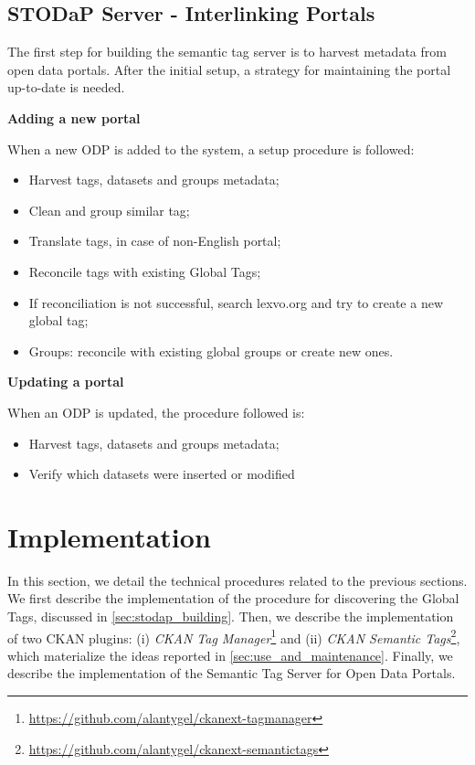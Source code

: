 \subsection{STODaP Server - Interlinking Portals}

The first step for building the semantic tag server is to harvest metadata from open data portals.
After the initial setup, a strategy for maintaining the portal up-to-date is needed.

\textbf{Adding a new portal}

When a new ODP is added to the system, a setup procedure is followed:
\begin{itemize}
	\item Harvest tags, datasets and groups metadata;
	\item Clean and group similar tag;
	\item Translate tags, in case of non-English portal;
	\item Reconcile tags with existing Global Tags;
	\item If reconciliation is not successful, search lexvo.org and try to create a new global tag;
	\item Groups: reconcile with existing global groups or create new ones.
\end{itemize}

\textbf{Updating a portal}

When an ODP is updated, the procedure followed is:
\begin{itemize}
	\item Harvest tags, datasets and groups metadata;
	\item Verify which datasets were inserted or modified
\end{itemize}

\section{Implementation}
\label{sec:implementation}

In this section, we detail the technical procedures related to the previous sections.
We first describe the implementation of the procedure for discovering the Global Tags, discussed in \autoref{sec:stodap_building}.
Then, we describe the implementation of two CKAN plugins:
(i) \emph{CKAN Tag Manager}\footnote{\url{https://github.com/alantygel/ckanext-tagmanager}} and 
(ii) \emph{CKAN Semantic Tags}\footnote{\url{https://github.com/alantygel/ckanext-semantictags}}, which materialize the ideas reported in \autoref{sec:use_and_maintenance}.
Finally, we describe the implementation of the Semantic Tag Server for Open Data Portals.

